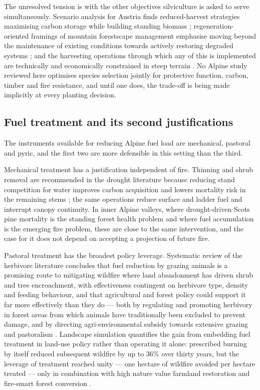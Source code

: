 \documentclass[11pt,a4paper]{article}
\begin{document}
The unresolved tension is with the other objectives silviculture is asked to serve simultaneously. Scenario analysis for Austria finds reduced-harvest strategies maximising carbon storage while building standing biomass \citep{jandl_strategies_2018}; regeneration-oriented framings of mountain forestscape management emphasise moving beyond the maintenance of existing conditions towards actively restoring degraded systems \citep{majlingova_sustainability_2025}; and the harvesting operations through which any of this is implemented are technically and economically constrained in steep terrain \citep{dinca_timber_2025}. No Alpine study reviewed here optimises species selection jointly for protective function, carbon, timber and fire resistance, and until one does, the trade-off is being made implicitly at every planting decision.

\subsection{Fuel treatment and its second justifications}

The instruments available for reducing Alpine fuel load are mechanical, pastoral and pyric, and the first two are more defensible in this setting than the third.

Mechanical treatment has a justification independent of fire. Thinning and shrub removal are recommended in the drought literature because reducing stand competition for water improves carbon acquisition and lowers mortality risk in the remaining stems \citep{giuggiola_droughtinduced_2010}; the same operations reduce surface and ladder fuel and interrupt canopy continuity. In inner Alpine valleys, where drought-driven Scots pine mortality is the standing forest health problem and where fuel accumulation is the emerging fire problem, these are close to the same intervention, and the case for it does not depend on accepting a projection of future fire.

Pastoral treatment has the broadest policy leverage. Systematic review of the herbivore literature concludes that fuel reduction by grazing animals is a promising route to mitigating wildfire where land abandonment has driven shrub and tree encroachment, with effectiveness contingent on herbivore type, density and feeding behaviour, and that agricultural and forest policy could support it far more effectively than they do --- both by regulating and promoting herbivory in forest areas from which animals have traditionally been excluded to prevent damage, and by directing agri-environmental subsidy towards extensive grazing and pastoralism \citep{rouetleduc_effects_2021}. Landscape simulation quantifies the gain from embedding fuel treatment in land-use policy rather than operating it alone: prescribed burning by itself reduced subsequent wildfire by up to 36\% over thirty years, but the leverage of treatment reached unity --- one hectare of wildfire avoided per hectare treated --- only in combination with high nature value farmland restoration and fire-smart forest conversion \citep{pais_optimizing_2023}.
\end{document}
